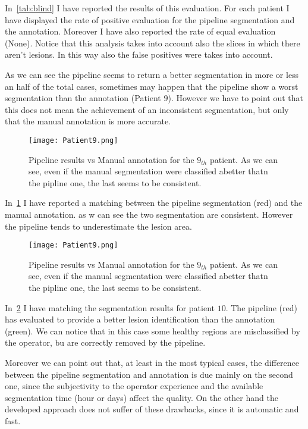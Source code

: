 \documentclass{standalone}
\begin{document}
	In \tablename\,\ref{tab:blind} I have reported the results of this evaluation. For each patient I have displayed the rate of positive evaluation  for the pipeline segmentation and the annotation. Moreover I have also reported the rate of equal evaluation (None). Notice that this analysis takes into account also the slices in which there aren't lesions. In this way also the false positives were takes into account. 
	
	As we can see the pipeline seems to return a better segmentation in more or less an half of the total cases, sometimes may happen that the pipeline show a worst segmentation than the annotation (Patient $9$). However we have to point out that this does not mean the achievement of an inconsistent segmentation, but only that the manual annotation is more accurate. 
	
	\begin{figure}
		\centering
		\texttt{[image: Patient9.png]}
		\caption{Pipeline results vs Manual annotation for the $9_{th}$ patient. As we can see, even if the manual segmentation were classified abetter thatn the pipline one, the last seems to be consistent.}\label{fig:Patient9}
	\end{figure}

	In \figurename\,\ref{fig:Patient9} I have reported a matching between the pipeline segmentation (red) and the manual annotation. as w can see the two segmentation are consistent. However the pipeline tends to underestimate the lesion area. 
	
		\begin{figure}
		\centering
		\texttt{[image: Patient9.png]}
		\caption{Pipeline results vs Manual annotation for the $9_{th}$ patient. As we can see, even if the manual segmentation were classified abetter thatn the pipline one, the last seems to be consistent.}\label{fig:Patient10}
	\end{figure}
	
	In \figurename\,\ref{fig:Patient10} I have matching the segmentation results for patient $10$. The pipeline (red) has evaluated to provide a better lesion identification than the annotation (green). We can notice that in this case some healthy regions are misclassified by the operator, bu are correctly removed by the pipeline.
	
	Moreover we can point out that, at least in the most typical cases, the difference between the pipeline segmentation and annotation is due mainly on the second one, since the subjectivity to the operator experience and the available segmentation time (hour or days)  affect the quality. On the other hand the developed approach does not suffer of these drawbacks, since it is automatic and fast.  
	
\end{document}
